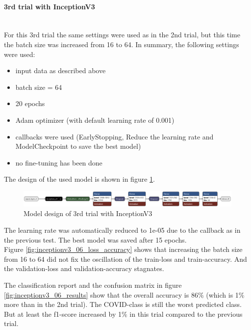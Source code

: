 \documentclass{article}
\begin{document}
\paragraph{3rd trial with InceptionV3}\mbox{}\\
For this 3rd trial the same settings were used as in the 2nd trial, but this time the batch size was increased from 16 to 64. In summary, the following settings were used: 
\begin{itemize}
\item input data as described above
\item batch size = 64
\item 20 epochs 
\item Adam optimizer (with default learning rate of 0.001)
\item callbacks were used (EarlyStopping, Reduce the learning rate and ModelCheckpoint to save the best model)
\item no fine-tuning has been done
\end{itemize}

The design of the used model is shown in figure \ref{fig:inceptionv3_06.keras_model_design}.
\begin{figure}[ht] %
    \centering
    \includegraphics[width=1.0\linewidth]{inceptionv3_06.keras_model_design_nice.png}
    \caption{Model design of 3rd trial with InceptionV3}
    \label{fig:inceptionv3_06.keras_model_design}
\end{figure}

The learning rate was automatically reduced to 1e-05 due to the callback as in the previous test. The best model was saved after 15 epochs. \\
Figure \ref{fig:inceptionv3_06_loss_accuracy} shows that increasing the batch size from 16 to 64 did not fix the oscillation of the train-loss and train-accuracy. And the validation-loss and validation-accuracy stagnates. 

The classification report and the confusion matrix in figure \ref{fig:inceptionv3_06_results} show that the overall accuracy is 86\%  (which is 1\% more than in the 2nd trial). The COVID-class is still the worst predicted class. But at least the f1-score increased by 1\% in this trial compared to the previous trial. 
\end{document}
